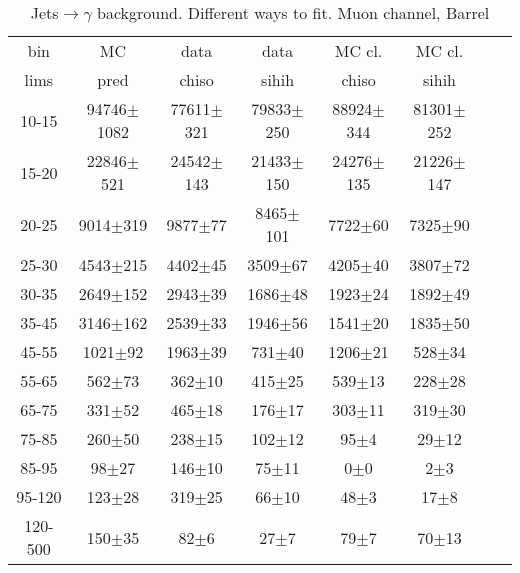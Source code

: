 \begin{table}[h]
  \scriptsize
  \begin{center}
  \caption{Jets$\rightarrow\gamma$ background. Different ways to fit. Muon channel, Barrel}
  \begin{tabular}{|c|c|c|c|c|c|c|c|}
    bin &  MC   & data  & data  & MC cl. & MC cl.\\ 
    lims & pred & chiso & sihih & chiso  & sihih \\ \hline
10-15 & 94746$\pm$1082 & 77611$\pm$321 & 79833$\pm$250 & 88924$\pm$344 & 81301$\pm$252   \\ \hline
15-20 & 22846$\pm$521 & 24542$\pm$143 & 21433$\pm$150 & 24276$\pm$135 & 21226$\pm$147   \\ \hline
20-25 & 9014$\pm$319 & 9877$\pm$77 & 8465$\pm$101 & 7722$\pm$60 & 7325$\pm$90   \\ \hline
25-30 & 4543$\pm$215 & 4402$\pm$45 & 3509$\pm$67 & 4205$\pm$40 & 3807$\pm$72   \\ \hline
30-35 & 2649$\pm$152 & 2943$\pm$39 & 1686$\pm$48 & 1923$\pm$24 & 1892$\pm$49   \\ \hline
35-45 & 3146$\pm$162 & 2539$\pm$33 & 1946$\pm$56 & 1541$\pm$20 & 1835$\pm$50   \\ \hline
45-55 & 1021$\pm$92 & 1963$\pm$39 & 731$\pm$40 & 1206$\pm$21 & 528$\pm$34   \\ \hline
55-65 & 562$\pm$73 & 362$\pm$10 & 415$\pm$25 & 539$\pm$13 & 228$\pm$28   \\ \hline
65-75 & 331$\pm$52 & 465$\pm$18 & 176$\pm$17 & 303$\pm$11 & 319$\pm$30   \\ \hline
75-85 & 260$\pm$50 & 238$\pm$15 & 102$\pm$12 & 95$\pm$4 & 29$\pm$12   \\ \hline
85-95 & 98$\pm$27 & 146$\pm$10 & 75$\pm$11 & 0$\pm$0 & 2$\pm$3   \\ \hline
95-120 & 123$\pm$28 & 319$\pm$25 & 66$\pm$10 & 48$\pm$3 & 17$\pm$8   \\ \hline
120-500 & 150$\pm$35 & 82$\pm$6 & 27$\pm$7 & 79$\pm$7 & 70$\pm$13   \\ \hline
  \end{tabular}
  \label{tab:Jets_to_gamma_diff_ways_to_fit_0}
  \end{center}
\end{table}

